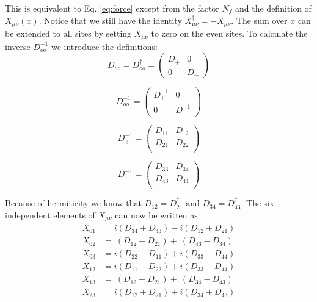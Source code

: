\documentclass[12pt]{article}
\begin{document}
This is equivalent to Eq. \eqref{eq:force} except from the factor $N_f$ and the definition of $X_{\mu\nu}(x)$. Notice that we still have the identity $X_{\mu\nu}^\dagger=-X_{\mu\nu}$. The sum over $x$ can be extended to all sites by setting $X_{\mu\nu}$ to zero on the even sites. To calculate the inverse $D_{oo}^{-1}$ we introduce the definitions:
\begin{equation}
 D_{oo} = D_{oo}^\dagger = \begin{pmatrix}
 D_+ & 0 \\
 0 & D_-
 \end{pmatrix}
\end{equation}

\begin{equation}
 D_{oo}^{-1} = \begin{pmatrix}
 D_{+}^{-1} & 0 \\
 0 & D_{-}^{-1}
 \end{pmatrix}
\end{equation}

\begin{equation}
 D_{+}^{-1} =
 \begin{pmatrix}
  D_{11} &  D_{12} \\
  D_{21} &  D_{22} \\
 \end{pmatrix}
\end{equation}

\begin{equation}
 D_{-}^{-1} =
 \begin{pmatrix}
  D_{33} &  D_{34} \\
  D_{43} &  D_{44} \\
 \end{pmatrix}
\end{equation}

Because of hermiticity we know that $D_{12} = D_{21}^\dagger$ and $D_{34} = D_{43}^\dagger$. The six independent elements of $X_{\mu\nu}$ can now be written as
\begin{align}
 X_{01} &= i(D_{34}+D_{43}) - i(D_{12}+D_{21}) \\
 X_{02} &= ~(D_{12}-D_{21}) + ~(D_{43}-D_{34}) \\
 X_{03} &= i(D_{22}-D_{11}) + i(D_{33}-D_{44}) \\
 X_{12} &= i(D_{11}-D_{22}) + i(D_{33}-D_{44}) \\
 X_{13} &= ~(D_{12}-D_{21}) + ~(D_{34}-D_{43}) \\
 X_{23} &= i(D_{12}+D_{21}) + i(D_{34}+D_{43})
\end{align}
\end{document}
